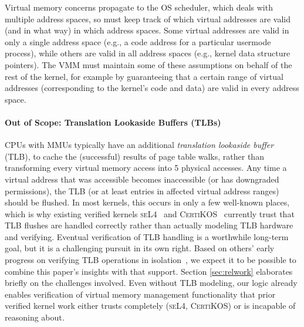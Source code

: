 Virtual memory concerns propagate to the OS scheduler, which deals with multiple 
address spaces, so must keep track of which virtual addresses are valid (and in what way) in which address spaces. 
Some virtual addresses are valid in only a single address space (e.g., a code address for a particular usermode 
process), while others are valid in all address spaces (e.g., kernel data structure pointers). 
The VMM must maintain some of these assumptions on behalf of the rest of the kernel, for example by guaranteeing that 
a certain range of virtual addresses (corresponding to the kernel's code and data) are valid in every address space.

\paragraph{Out of Scope: Translation Lookaside Buffers (TLBs)}
CPUs with MMUs typically have an additional \emph{translation lookaside buffer}
(TLB), to cache the (successful) results of page table walks, rather than transforming every virtual
memory access into 5 physical accesses. 
Any time a virtual address that was accessible becomes inaccessible (or has downgraded permissions),
the TLB (or at least entries in affected virtual address ranges) should be flushed.
In most kernels, this occurs in only a few well-known places, which is why existing verified kernels
\textsc{seL4}~\cite{Klein2009seL4,seL4TOCS} and \textsc{CertiKOS}~\cite{gu15,gu2016certikos} currently
trust that TLB flushes are handled correctly rather than actually modeling TLB hardware and verifying.
Eventual verification of TLB handling is a worthwhile long-term goal, but it is a challenging pursuit in its
own right. Based on others' early progress on verifying TLB operations in isolation~\cite{syeda2020formal}, we expect
it to be possible to combine this paper's insights with that support. 
Section \ref{sec:relwork} elaborates briefly on the challenges involved.
Even without TLB modeling,
our logic already enables verification of virtual memory management functionality that prior verified kernel work
either trusts completely (\textsc{seL4}, \textsc{CertiKOS}) or is incapable of reasoning about.


